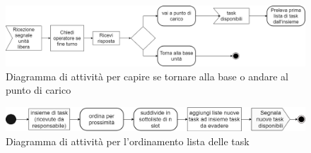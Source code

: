 \begin{figure}[H]
	\centering
	\includegraphics[scale=0.3]{res/images/diagramma_di_attivita1.png}
	\caption{Diagramma di attività per capire se tornare alla base o andare al punto di carico}
\end{figure}
\begin{figure}[H]
	\centering
	\includegraphics[scale=0.3]{res/images/diagramma_di_attivita3.png}
	\caption{Diagramma di attività per l'ordinamento lista delle task}
\end{figure}

